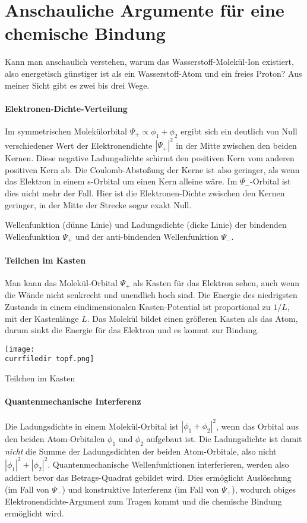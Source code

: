 \section{Anschauliche Argumente für eine chemische Bindung}

Kann man anschaulich verstehen, warum das Wasserstoff-Molekül-Ion existiert, also energetisch günstiger ist als ein Wasserstoff-Atom und ein freies Proton? Aus meiner Sicht gibt es zwei bis drei Wege.

\paragraph{Elektronen-Dichte-Verteilung} Im symmetrischen Molekülorbital $\Psi_+ \propto \phi_1 + \phi_2$ ergibt sich ein deutlich von Null verschiedener Wert der Elektronendichte $|\Psi_+|^2$ in der Mitte zwischen den beiden Kernen. Diese negative Ladungsdichte schirmt den positiven Kern vom anderen positiven Kern ab. Die Coulomb-Abstoßung der Kerne ist also geringer, als wenn das Elektron in einem s-Orbital um einen Kern alleine  wäre. Im $\Psi_-$-Orbital ist dies nicht mehr der Fall. Hier ist die Elektronen-Dichte zwischen den Kernen geringer, in der Mitte der Strecke sogar exakt Null.
%
\begin{marginfigure}[-50mm]
\caption{ Wellenfunktion (dünne Linie) und Ladungsdichte (dicke Linie) der bindenden Wellenfunktion $\Psi_+$ und der  anti-bindenden Wellenfunktion $\Psi_-$.}
\end{marginfigure}



\paragraph{Teilchen im Kasten}  Man kann das Molekül-Orbital $\Psi_+$ als Kasten für das Elektron sehen, auch wenn die Wände nicht senkrecht und unendlich hoch sind. Die Energie des niedrigsten Zustands in einem eindimensionalen  Kasten-Potential ist proportional zu $1/L$, mit der Kastenlänge $L$. Das Molekül bildet einen größeren Kasten als das Atom, darum sinkt die Energie für das Elektron und es kommt zur Bindung.
%
\begin{marginfigure}
\texttt{[image: \\currfiledir topf.png]}
\caption{Teilchen im Kasten}
\end{marginfigure}

\paragraph{Quantenmechanische Interferenz} Die Ladungsdichte in einem Molekül-Orbital ist $| \phi_1 + \phi_2 |^2$, wenn das Orbital aus den beiden Atom-Orbitalen $\phi_1$ und $\phi_2$ aufgebaut ist. Die Ladungsdichte ist damit \emph{nicht} die Summe der Ladungsdichten der beiden Atom-Orbitale, also nicht $| \phi_1 |^2 +| \phi_2 |^2$. Quantenmechanische Wellenfunktionen interferieren, werden also addiert bevor das Betrags-Quadrat gebildet wird. Dies ermöglicht Auslöschung (im Fall von $\Psi_-$) und konstruktive Interferenz (im Fall von $\Psi_+$), wodurch obiges Elektronendichte-Argument zum Tragen kommt und  die chemische Bindung ermöglicht wird.



